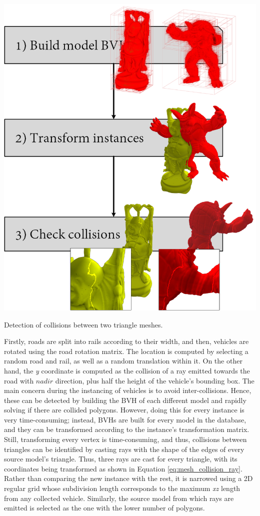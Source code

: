 \begin{marginfigure} [8.cm]
	\centering
	\includegraphics[width=\linewidth]{figs/lidar_simulation/mesh_collision.png}
	\caption{Detection of collisions between two triangle meshes. }
	\label{fig:triangle_mesh_collision}
\end{marginfigure}
Firstly, roads are split into rails according to their width, and then, vehicles are rotated using the road rotation matrix. The location is computed by selecting a random road and rail, as well as a random translation within it. On the other hand, the \textit{y} coordinate is computed as the collision of a ray emitted towards the road with $\textit{nadir}$ direction, plus half the height of the vehicle's bounding box. The main concern during the instancing of vehicles is to avoid inter-collisions. Hence, these can be detected by building the BVH of each different model and rapidly solving if there are collided polygons. However, doing this for every instance is very time-consuming; instead, BVHs are built for every model in the database, and they can be transformed according to the instance's transformation matrix. Still, transforming every vertex is time-consuming, and thus, collisions between triangles can be identified by casting rays with the shape of the edges of every source model's triangle. Thus, three rays are cast for every triangle, with its coordinates being transformed as shown in Equation \ref{eq:mesh_collision_ray}. Rather than comparing the new instance with the rest, it is narrowed using a 2D regular grid whose subdivision length corresponds to the maximum \textit{xz} length from any collected vehicle. Similarly, the source model from which rays are emitted is selected as the one with the lower number of polygons.
